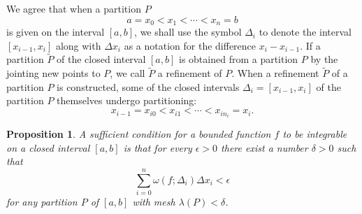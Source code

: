 \documentclass[a4paper,12pt]{article} %
\newtheorem{proposition}{Proposition}[section]
\begin{document}
We agree that when a partition $P$
\[
    a = x_0 < x_1 < \cdots < x_n = b
    \]
is given on the interval $[a,b]$, we shall use the symbol $\Delta_i$ to 
denote the interval $[x_{i-1}, x_i]$ along with $\Delta x_i$ as a notation 
for the difference $x_i - x_{i-1}$. If a partition $\widetilde{P}$
of the closed interval $[a,b]$ is obtained from a partition $P$
by the jointing new points to $P$, we call $\widetilde{P}$ a 
refinement of $P$. When a refinement $\widetilde{P}$ of a partition 
$P$ is constructed, some of the closed intervals $\Delta_i=[x_{i-1},x_i]$ 
of the partition $P$ themselves undergo partitioning:
\[
    x_{i-1} = x_{i0} < x_{i1} < \cdots < x_{in_i} = x_i.
    \]
\begin{proposition}
    \normalfont
    A sufficient condition for a bounded function $f$ to be integrable 
    on a closed interval $[a,b]$ is that for every $\epsilon > 0$ there exist a 
    number $\delta > 0$ such that 
    \[
        \sum_{i=0}^n\omega(f;\Delta_i)\Delta x_i < \epsilon 
        \]
    for any partition $P$ of $[a,b]$ with mesh $\lambda(P) < \delta$.
\end{proposition}
\end{document}
